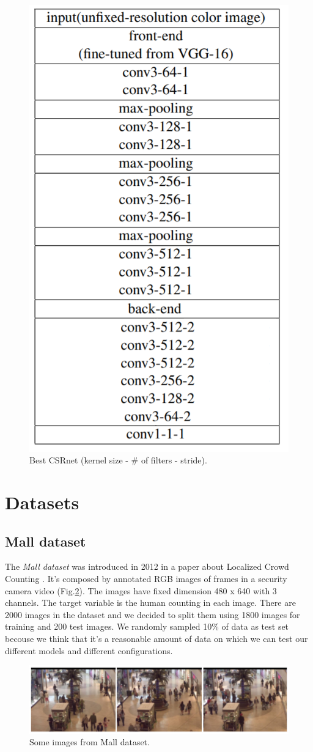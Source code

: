 \documentclass[10pt,twocolumn,letterpaper]{article}
\begin{document}
\begin{figure}[h!]
	\includegraphics[width=0.5\columnwidth]{pics/CSRnet.png}
	\centering
	\caption{Best CSRnet  (kernel size - \# of filters - stride).}
	\centering
	\label{fig:CSRnet}
\end{figure}



\section{Datasets}
\subsection{Mall dataset}

The \textit{Mall dataset} was introduced in 2012 in a paper about Localized Crowd Counting \cite{chen2012feature}. It's composed by annotated RGB images of frames in a security camera video (Fig.\ref{fig:security}). The images have fixed dimension 480 x 640 with 3 channels. The target variable is the human counting in each image. There are 2000 images in the dataset and we decided to split them using 1800 images for training and 200 test images. We randomly sampled 10\% of data as test set becouse we think that it's a reasonable amount of data on which we can test our different models and different configurations. 


\begin{figure}[h!]%
	\includegraphics[width=1\columnwidth]{pics/securitycameraimages.png}
	\centering
	\caption{Some images from Mall dataset.}
	\centering
	\label{fig:security}
\end{figure}
\end{document}
